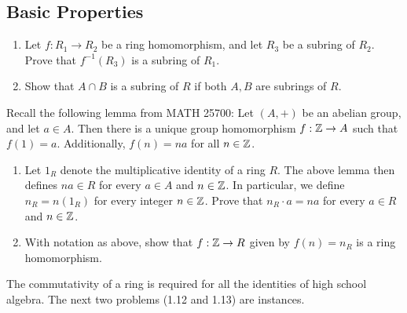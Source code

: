 \documentclass[../psets.tex]{subfiles}
\begin{document}
\subsection*{Basic Properties}
\begin{enumerate}[start=7]
    \item Let $f:R_1\to R_2$ be a ring homomorphism, and let $R_3$ be a subring of $R_2$. Prove that $f^{-1}(R_3)$ is a subring of $R_1$.
    \item Show that $A\cap B$ is a subring of $R$ if both $A,B$ are subrings of $R$.
\end{enumerate}
Recall the following lemma from MATH 25700: Let $(A,+)$ be an abelian group, and let $a\in A$. Then there is a unique group homomorphism $f:\mathbb{Z}\to A$ such that $f(1)=a$. Additionally, $f(n)=na$ for all $n\in\mathbb{Z}$.
\begin{enumerate}[resume]
    \item Let $1_R$ denote the multiplicative identity of a ring $R$. The above lemma then defines $na\in R$ for every $a\in A$ and $n\in\mathbb{Z}$. In particular, we define $n_R=n(1_R)$ for every integer $n\in\mathbb{Z}$. Prove that $n_R\cdot a=na$ for every $a\in R$ and $n\in\mathbb{Z}$.
    \item With notation as above, show that $f:\mathbb{Z}\to R$ given by $f(n)=n_R$ is a ring homomorphism.
\end{enumerate}
The commutativity of a ring is required for all the identities of high school algebra. The next two problems (1.12 and 1.13) are instances.
\end{document}
